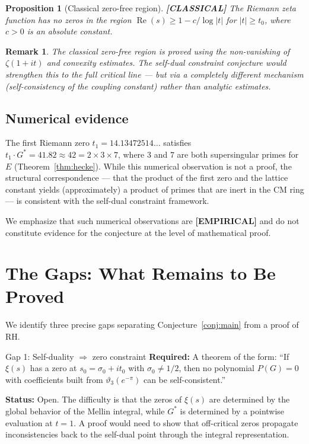 \documentclass[11pt]{article}
\theoremstyle{tight}
\newtheorem{proposition}[theorem]{Proposition}
\theoremstyle{plainroman}
\newtheorem{remark}[theorem]{Remark}
\begin{document}
\begin{proposition}[Classical zero-free region]\label{prop:zerofree}
\textbf{[CLASSICAL]}
The Riemann zeta function has no zeros in the region $\operatorname{Re}(s)\ge 1-c/\log|t|$ for $|t|\ge t_0$, where $c>0$ is an absolute constant.
\end{proposition}

\begin{remark}
The classical zero-free region is proved using the non-vanishing of $\zeta(1+it)$ and convexity estimates.
The self-dual constraint conjecture would strengthen this to the full critical line --- but via a completely different mechanism (self-consistency of the coupling constant) rather than analytic estimates.
\end{remark}

\subsection{Numerical evidence}

The first Riemann zero $t_1=14.13472514\ldots$ satisfies $t_1\cdot G^*=41.82\approx 42=2\times 3\times 7$, where $3$ and $7$ are both supersingular primes for $E$ (Theorem~\ref{thm:hecke}).
While this numerical observation is not a proof, the structural correspondence --- that the product of the first zero and the lattice constant yields (approximately) a product of primes that are inert in the CM ring --- is consistent with the self-dual constraint framework.

We emphasize that such numerical observations are \textbf{[EMPIRICAL]} and do not constitute evidence for the conjecture at the level of mathematical proof.

\section{The Gaps: What Remains to Be Proved}

We identify three precise gaps separating Conjecture~\ref{conj:main} from a proof of RH.

\begin{statusbox}{Gap 1: Self-duality $\Rightarrow$ zero constraint}
\textbf{Required:} A theorem of the form: ``If $\xi(s)$ has a zero at $s_0=\sigma_0+it_0$ with $\sigma_0\neq 1/2$, then no polynomial $P(G)=0$ with coefficients built from $\vartheta_3(e^{-\pi})$ can be self-consistent.''

\textbf{Status:} Open.
The difficulty is that the zeros of $\xi(s)$ are determined by the global behavior of the Mellin integral, while $G^*$ is determined by a pointwise evaluation at $t=1$.
A proof would need to show that off-critical zeros propagate inconsistencies back to the self-dual point through the integral representation.
\end{statusbox}
\end{document}
